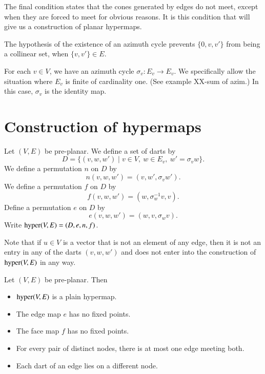 The final condition states that the cones generated by edges do not
meet, except when they are forced to meet for obvious reasons.  It
is this condition that will give us a construction of planar
hypermaps.

\begin{remark} The hypothesis of the existence of an azimuth cycle
prevents $\{0,v,v'\}$ from being a collinear set, when $\{v,v'\}\in
E$.
\end{remark}

\begin{remark}
For each $v\in V$, we have an azimuth cycle $\sigma_v:E_v\to E_v$.
We specifically allow the situation where $E_v$ is finite of
cardinality one.  (See example XX-sum of azim.) In this case,
$\sigma_v$ is the identity map.
\end{remark}

\section{Construction of hypermaps}

Let $(V,E)$ be pre-planar.  We define a set of darts by
    $$D = \{(v,w,w')\mid v\in V,\ w\in E_v,\ w' = \sigma_v w\}.$$
We define a permutation $n$ on $D$ by
    $$n(v,w,w') = (v,w',\sigma_v w').$$
We define a permutation $f$ on $D$ by
    $$
    f (v,w,w') = (w,\sigma_w^{-1} v,v).
    $$
Define a permutation $e$ on $D$ by
    $$
    e (v,w,w') = (w,v,\sigma_w v).
    $$
Write ${\operatorname{hyper}}(V,E)=(D,e,n,f)$.

Note that if $u\in V$ is a vector that is not an element of any
edge, then it is not an entry in any of the darts $(v,w,w')$ and
does not enter into the construction of ${\operatorname{hyper}}(V,E)$  in any
way.

\begin{lemma} Let $(V,E)$ be pre-planar.  Then
    \begin{itemize}
    \item ${\operatorname{hyper}}(V,E)$ is a plain hypermap.
    \item The edge map $e$ has no fixed
points.
    \item The face map $f$ has no fixed points.
    \item For every pair of distinct nodes, there is at most one
    edge meeting both.
    \item Each dart of an edge lies on a different node.
    \end{itemize}
\end{lemma}

